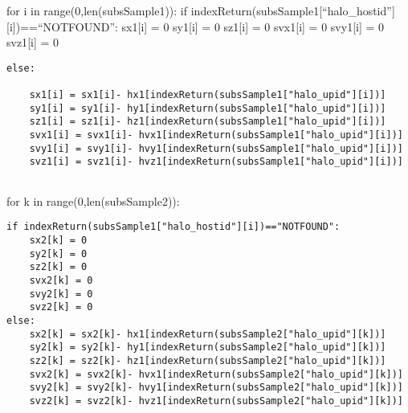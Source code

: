 \documentclass[11pt]{article}
\begin{document}
for i in range(0,len(subsSample1)): if
indexReturn(subsSample1{[}``halo\_hostid''{]}{[}i{]})==``NOTFOUND'':
sx1{[}i{]} = 0 sy1{[}i{]} = 0 sz1{[}i{]} = 0 svx1{[}i{]} = 0 svy1{[}i{]}
= 0 svz1{[}i{]} = 0

\begin{verbatim}
else:  
    
    sx1[i] = sx1[i]- hx1[indexReturn(subsSample1["halo_upid"][i])]
    sy1[i] = sy1[i]- hy1[indexReturn(subsSample1["halo_upid"][i])]
    sz1[i] = sz1[i]- hz1[indexReturn(subsSample1["halo_upid"][i])]
    svx1[i] = svx1[i]- hvx1[indexReturn(subsSample1["halo_upid"][i])]
    svy1[i] = svy1[i]- hvy1[indexReturn(subsSample1["halo_upid"][i])]
    svz1[i] = svz1[i]- hvz1[indexReturn(subsSample1["halo_upid"][i])]
    
\end{verbatim}

for k in range(0,len(subsSample2)):

\begin{verbatim}
if indexReturn(subsSample1["halo_hostid"][i])=="NOTFOUND":
    sx2[k] = 0
    sy2[k] = 0
    sz2[k] = 0
    svx2[k] = 0
    svy2[k] = 0
    svz2[k] = 0
else:  
    sx2[k] = sx2[k]- hx1[indexReturn(subsSample2["halo_upid"][k])]
    sy2[k] = sy2[k]- hy1[indexReturn(subsSample2["halo_upid"][k])]
    sz2[k] = sz2[k]- hz1[indexReturn(subsSample2["halo_upid"][k])]
    svx2[k] = svx2[k]- hvx1[indexReturn(subsSample2["halo_upid"][k])]
    svy2[k] = svy2[k]- hvy1[indexReturn(subsSample2["halo_upid"][k])]
    svz2[k] = svz2[k]- hvz1[indexReturn(subsSample2["halo_upid"][k])]
\end{verbatim}
\end{document}

